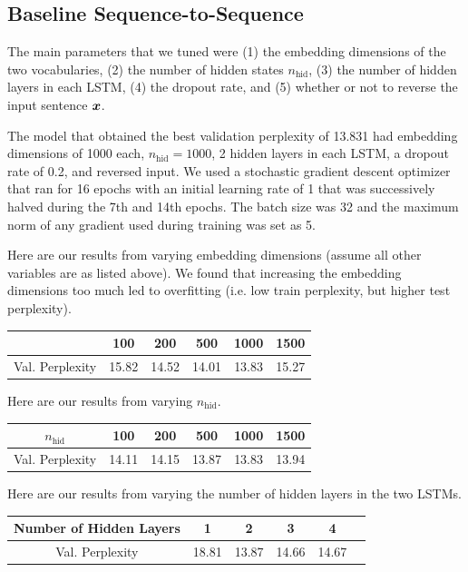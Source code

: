 \documentclass[11pt]{article}
\begin{document}
\subsection{Baseline Sequence-to-Sequence} 
The main parameters that we tuned were (1) the embedding dimensions of the two vocabularies, (2) the number of hidden states $n_\text{hid}$, (3) the number of hidden layers in each LSTM, (4) the dropout rate, and (5) whether or not to reverse the input sentence $\boldsymbol{x}$.    

The model that obtained the best validation perplexity of 13.831 had embedding dimensions of 1000 each, $n_\text{hid} = 1000$, 2 hidden layers in each LSTM, a dropout rate of 0.2, and reversed input.  We used a stochastic gradient descent optimizer that ran for 16 epochs with an initial learning rate of 1 that was successively halved during the 7th and 14th epochs.  The batch size was 32 and the maximum norm of any gradient used during training was set as 5.

Here are our results from varying embedding dimensions (assume all other variables are as listed above).  We found that increasing the embedding dimensions too much led to overfitting (i.e. low train perplexity, but higher test perplexity).  

\begin{center}
	\begin{tabular}{ c | c c c c c}
		 \text{Embedding Dimension} & 100 & 200 & 500 & 1000 & 1500  \\
		\hline
		Val. Perplexity & 15.82 & 14.52 & 14.01 & 13.83 & 15.27
	\end{tabular}
\end{center}    

Here are our results from varying $n_\text{hid}$.  

\begin{center}
	\begin{tabular}{ c | c c c c c}
		 $n_\text{hid}$ & 100 & 200 & 500 & 1000 & 1500  \\
		\hline
		Val. Perplexity & 14.11 & 14.15 & 13.87 & 13.83 & 13.94
	\end{tabular}
\end{center}    

Here are our results from varying the number of hidden layers in the two LSTMs.  

\begin{center}
	\begin{tabular}{ c | c c c c c}
		 Number of Hidden Layers & 1 & 2 & 3 & 4   \\
		\hline
		Val. Perplexity & 18.81 & 13.87 & 14.66 & 14.67
	\end{tabular}
\end{center}    
\end{document}
